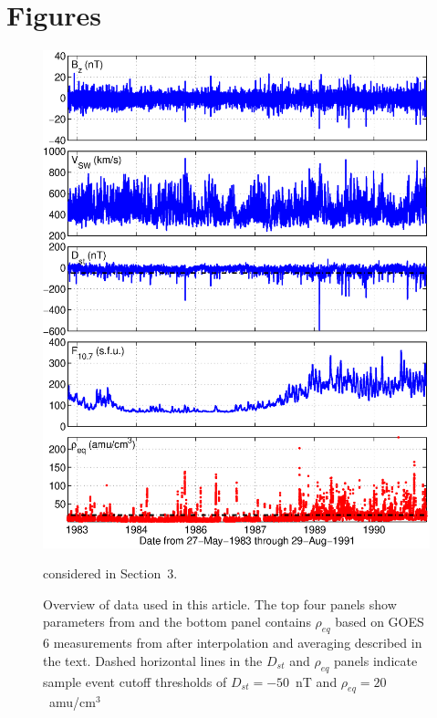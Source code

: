 \documentclass[10pt,twocolumn]{article}
\begin{document}
\newpage
\footnotesize



\clearpage
\section{Figures}

\begin{figure}[htp!]
\centering
\includegraphics[scale=0.45]{figures/alldata-GOES6-1983-1991.eps}
\caption{Overview of data used in this article. The top four panels show parameters from \cite{Kondrashov2014ReconstructionOfGaps} and the bottom panel contains $\rho_{eq}$ based on GOES 6 measurements from \cite{Denton} after interpolation and averaging described in the text. Dashed horizontal lines in the $D_{st}$ and $\rho_{eq}$ panels indicate sample event cutoff thresholds of $D_{st} = -50$~nT and $\rho_{eq} = 20$~amu/cm$^3$} considered in Section~3.
\label{AllData}
\end{figure}
\end{document}
